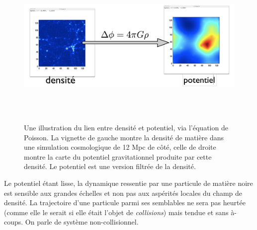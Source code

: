 \begin{figure}[htbp]
	\centering
		\includegraphics[height=8cm]{figs/poisson.png}
	\caption[Une illustration du lien entre densité et potentiel, via l'équation de Poisson.]{Une illustration du lien entre densité et potentiel, via l'équation de Poisson. La vignette de gauche montre la densité de matière dans une simulation cosmologique de 12 Mpc de côté, celle de droite montre la carte du potentiel gravitationnel produite par cette densité. Le potentiel est une version filtrée de la densité.} 
	\label{f:poisson}
\end{figure}

Le potentiel étant lisse, la dynamique ressentie par une particule de matière noire est sensible aux grandes échelles et non pas aux aspérités locales du champ de densité. La trajectoire d'une particule parmi ses semblables ne sera pas heurtée (comme elle le serait si elle était l'objet de \textit{collisions}) mais tendue et sans à-coups. On parle de système non-collisionnel.

